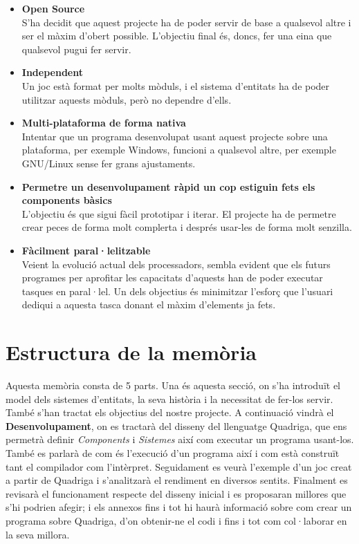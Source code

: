 \begin{itemize}
  \item {\bf Open Source} \hfill \\
    S'ha decidit que aquest projecte ha de poder servir de base a qualsevol altre i ser el màxim d'obert possible. L'objectiu final és, doncs, fer una eina que qualsevol pugui fer servir.
    
  \item {\bf Independent} \hfill \\
    Un joc està format per molts mòduls, i el sistema d'entitats ha de poder utilitzar aquests mòduls, però no dependre d'ells.
    
  \item {\bf Multi-plataforma de forma nativa} \hfill \\
    Intentar que un programa desenvolupat usant aquest projecte sobre una plataforma, per exemple Windows, funcioni a qualsevol altre, per exemple GNU/Linux sense fer grans ajustaments.
    
  \item {\bf Permetre un desenvolupament ràpid un cop estiguin fets els components bàsics} \hfill \\
    L'objectiu és que sigui fàcil prototipar i iterar. El projecte ha de permetre crear peces de forma molt complerta i després usar-les de forma molt senzilla.
    
  \item {\bf Fàcilment paral·lelitzable} \hfill \\
    Veient la evolució actual dels processadors, sembla evident que els futurs programes per aprofitar les capacitats d'aquests han de poder executar tasques en paral·lel. Un dels objectius és minimitzar l'esforç que l'usuari dediqui a aquesta tasca donant el màxim d'elements ja fets.
\end{itemize}

\section{Estructura de la memòria}

Aquesta memòria consta de 5 parts. Una és aquesta secció, on s'ha introduït el model dels sistemes d'entitats, la seva història i la necessitat de fer-los servir. També s'han tractat els objectius del nostre projecte. A continuació vindrà el {\bf Desenvolupament}, on es tractarà del disseny del llenguatge Quadriga, que ens permetrà definir {\em Components} i {\em Sistemes} així com executar un programa usant-los. També es parlarà de com és l'execució d'un programa així i com està construït tant el compilador com l'intèrpret. Seguidament es veurà l'exemple d'un joc creat a partir de Quadriga i s'analitzarà el rendiment en diversos sentits. Finalment es revisarà el funcionament respecte del disseny inicial i es proposaran millores que s'hi podrien afegir; i els annexos fins i tot hi haurà informació sobre com crear un programa sobre Quadriga, d'on obtenir-ne el codi i fins i tot com col·laborar en la seva millora.